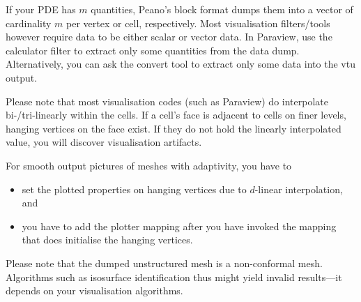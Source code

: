 If your PDE has $m$ quantities, Peano's block format dumps them into a vector of
cardinality $m$ per vertex or cell, respectively. 
Most visualisation filters/tools however require data to be either scalar or 
vector data. 
In Paraview, use the calculator filter to extract only some quantities from the 
data dump.
Alternatively, you can ask the convert tool to extract only some data into the
vtu output.

\noindent
Please note that most visualisation codes (such as Paraview) do interpolate
bi-/tri-linearly within the cells. 
If a cell's face is adjacent to cells on finer levels, hanging vertices on the
face exist.
If they do not hold the linearly interpolated value, you will discover
visualisation artifacts.

\begin{remark}
  For smooth output pictures of meshes with adaptivity, you have to 
  \begin{itemize}
    \item set the plotted properties on hanging vertices due to $d$-linear
    interpolation, and
    \item you have to add the plotter mapping after you have invoked the mapping
    that does initialise the hanging vertices.
  \end{itemize}
\end{remark}


\noindent
Please note that the dumped unstructured mesh is a non-conformal mesh. 
Algorithms such as isosurface identification thus might yield invalid
results---it depends on your visualisation algorithms.


